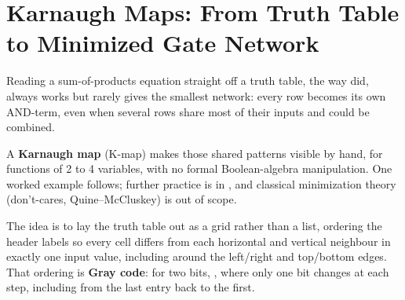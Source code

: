 
\section{Karnaugh Maps: From Truth Table to Minimized Gate Network}
\label{c2:a1}
Reading a sum-of-products equation straight off a truth table, the way  did, always
works but rarely gives the smallest network: every  row becomes its own AND-term, even when
several rows share most of their inputs and could be combined.

A \textbf{Karnaugh map} (K-map) makes those shared patterns visible by hand, for functions of 2 to 4
variables, with no formal Boolean-algebra manipulation. One worked example follows; further practice
is in , and classical minimization theory (don't-cares, Quine--McCluskey)
is out of scope.

The idea is to lay the truth table out as a grid rather than a list, ordering the header labels so
every cell differs from each horizontal and vertical neighbour in exactly one input value, including
around the left/right and top/bottom edges. That ordering is \textbf{Gray code}: for two bits,
, where only one bit changes at each step, including from the last entry back
to the first.

